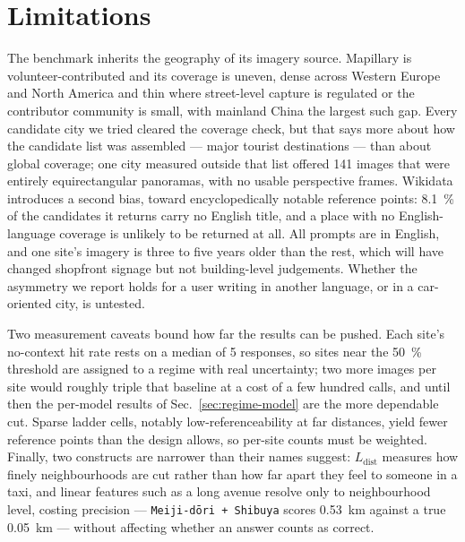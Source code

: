 \documentclass[10pt,a4paper]{article}
\newcommand{\Ldist}{\ensuremath{L_{\mathrm{dist}}}}
\begin{document}
\section{Limitations}
\label{sec:limits}

The benchmark inherits the geography of its imagery source. Mapillary is
volunteer-contributed and its coverage is uneven, dense across Western Europe
and North America and thin where street-level capture is regulated or the
contributor community is small, with mainland China the largest such gap. Every
candidate city we tried cleared the coverage check, but that says more about how
the candidate list was assembled --- major tourist destinations --- than about
global coverage; one city measured outside that list offered \num{141} images
that were entirely equirectangular panoramas, with no usable perspective frames.
Wikidata introduces a second bias, toward encyclopedically notable reference
points: \SI{8.1}{\percent} of the candidates it returns carry no English title,
and a place with no English-language coverage is unlikely to be returned at
all. All
prompts are in English, and one site's imagery is three to five years older than
the rest, which will have changed shopfront signage but not building-level
judgements. Whether the asymmetry we report holds for a user writing in another
language, or in a car-oriented city, is untested.

Two measurement caveats bound how far the results can be pushed. Each site's
no-context hit rate rests on a median of \num{5} responses, so sites near the
\SI{50}{\percent} threshold are assigned to a regime with real uncertainty; two
more images per site would roughly triple that baseline at a cost of a few
hundred calls, and until then the per-model results of
Sec.~\ref{sec:regime-model} are the more dependable cut. Sparse ladder cells,
notably low-referenceability at far distances, yield fewer reference points than
the design allows, so per-site counts must be weighted. Finally, two constructs
are narrower than their names suggest: \Ldist{} measures how finely
neighbourhoods are cut rather than how far apart they feel to someone in a taxi,
and linear features such as a long avenue resolve only to neighbourhood level,
costing precision --- \texttt{Meiji-dōri + Shibuya} scores
\SI{0.53}{\kilo\metre} against a true \SI{0.05}{\kilo\metre} --- without
affecting whether an answer counts as correct.

\end{document}
